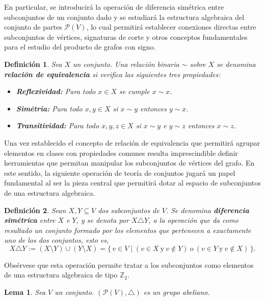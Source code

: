 \documentclass[11pt,a4paper,spanish]{report}
\theoremstyle{plain}
\newtheorem{lema}[teorema]{Lema}
\newtheorem{definicion}{Definición}[chapter]
\begin{document}
En particular, se introducirá la operación de diferencia simétrica entre 
subconjuntos de un conjunto dado y se estudiará la estructura algebraica 
del conjunto de partes $\mathcal{P}(V)$, lo cual permitirá establecer conexiones directas entre 
subconjuntos de vértices, signaturas de corte y  otros conceptos fundamentales para el estudio del producto de grafos con signo.



\begin{definicion} \cite{doerr2013applied}\label{def_relacion_equivalencia}
Sea $X$ un conjunto. Una relación binaria $\sim$ sobre $X$ se denomina \textbf{relación de equivalencia} si verifica las siguientes tres propiedades:
\begin{itemize}
\item[(i)] \textbf{Reflexividad:} Para todo $x \in X$ se cumple $x \sim x$.
\item[(ii)] \textbf{Simétria:} Para todo $x, y \in X$ si $x \sim y$ entonces $y \sim x$.
\item[(iii)] \textbf{Transitividad:} Para todo $x, y, z \in X$ si $x \sim y$ e $y \sim z$ entonces $x \sim z$.
\end{itemize}
\end{definicion}
Una vez establecido el concepto de relación de equivalencia que permitirá agrupar elementos en clases con propiedades comunes resulta imprescindible definir herramientas que permitan manipular los subconjuntos de vértices del grafo. En este sentido, la siguiente operación de teoría de conjuntos jugará un papel fundamental al ser la pieza central que permitirá dotar al espacio de subconjuntos de una estructura algebraica.

\begin{definicion}\cite{zaslavsky1982signed}
Sean $X, Y \subseteq V$ dos subconjuntos de $V$.  
Se denomina \textbf{diferencia simétrica} entre $X$ e $Y$, y se denota por $X \triangle Y$, a la operación que da como resultado un conjunto formado por los elementos que pertenecen a exactamente uno de los dos conjuntos, esto es,
\[
X \triangle Y := (X \setminus Y) \cup (Y \setminus X)
= \{\, v \in V \mid (v \in X \ \text{y}\ v \notin Y)\ \text{o}\ (v \in Y \ \text{y}\ v \notin X)\,\}.
\]
\end{definicion}
Obsérvese que esta operación permite tratar a los subconjuntos como elementos de una estructura algebraica de tipo 
$\mathbb{Z}_2$.

\begin{lema}\cite{doerr2013applied}
Sea $V$ un conjunto. $(\mathcal{P}(V),\triangle)$
es un grupo abeliano.
\end{lema}
\end{document}
